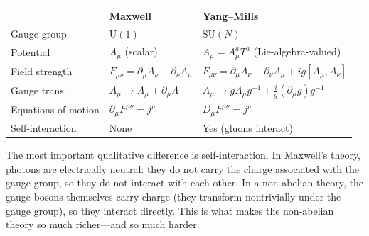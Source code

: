 \begin{center}
\renewcommand{\arraystretch}{1.5}
\begin{tabular}{|l|l|l|}
\hline
 & Maxwell & Yang--Mills \\
\hline
Gauge group & $\mathrm{U}(1)$ & $\mathrm{SU}(N)$ \\
Potential & $A_\mu$ (scalar) & $A_\mu = A_\mu^a T^a$ (Lie-algebra-valued) \\
Field strength & $F_{\mu\nu} = \partial_\mu A_\nu - \partial_\nu A_\mu$ & $F_{\mu\nu} = \partial_\mu A_\nu - \partial_\nu A_\mu + ig[A_\mu, A_\nu]$ \\
Gauge trans. & $A_\mu \to A_\mu + \partial_\mu\Lambda$ & $A_\mu \to gA_\mu g^{-1} + \frac{i}{g}(\partial_\mu g)g^{-1}$ \\
Equations of motion & $\partial_\mu F^{\mu\nu} = j^\nu$ & $D_\mu F^{\mu\nu} = j^\nu$ \\
Self-interaction & None & Yes (gluons interact) \\
\hline
\end{tabular}
\end{center}

The most important qualitative difference is self-interaction. In Maxwell's theory, photons are electrically neutral: they do not carry the charge associated with the gauge group, so they do not interact with each other. In a non-abelian theory, the gauge bosons themselves carry charge (they transform nontrivially under the gauge group), so they interact directly. This is what makes the non-abelian theory so much richer---and so much harder.

